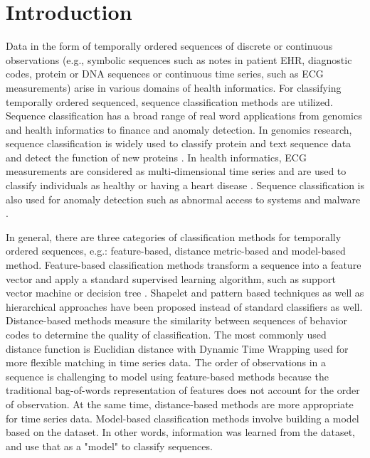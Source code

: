 \documentclass{amia_summit_2018}
\begin{document}
\section*{Introduction}
Data in the form of temporally ordered sequences of discrete or continuous observations (e.g., symbolic sequences such as notes in patient EHR, diagnostic codes, protein or DNA sequences or continuous time series, such as ECG measurements) arise in various domains of health informatics. For classifying temporally ordered sequenced, sequence classification methods are utilized. Sequence classification has a broad range of real word applications from genomics and health informatics to finance and anomaly detection. In genomics research, sequence classification is widely used to classify protein and text sequence data \cite{yakhnenko2005discriminatively} and detect the function of new proteins \cite{deshpande2002evaluation}. In health informatics, ECG measurements are considered as multi-dimensional time series and are used to classify individuals as healthy or having a heart disease \cite{wei2006semi}. Sequence classification is also used for anomaly detection such as abnormal access to systems \cite{lane1999temporal} and malware \cite{drew2017polymorphic}.

In general, there are three categories of classification methods for temporally ordered sequences, e.g.: feature-based, distance metric-based and model-based method. Feature-based classification methods transform a sequence into a feature vector and apply a standard supervised learning algorithm, such as support vector machine \cite{leslie2004fast} or decision tree \cite{chuzhanova1998feature}. Shapelet \cite{ye2009time} and pattern \cite{kudenko1998feature, lesh1999mining} based techniques as well as hierarchical approaches \cite{nallam2016effective} have been proposed instead of standard classifiers as well. Distance-based methods measure the similarity between sequences of behavior codes to determine the quality of classification. The most commonly used distance function is Euclidian distance \cite{keogh2003need} with Dynamic Time Wrapping \cite{keogh2000scaling} used for more flexible matching in time series data. The order of observations in a sequence is challenging to model using feature-based methods because the traditional bag-of-words representation of features does not account for the order of observation. At the same time, distance-based methods are more appropriate for time series data. Model-based classification methods involve building a model based on the dataset. In other words, information was learned from the dataset, and use that as a "model" to classify sequences.  
\end{document}
